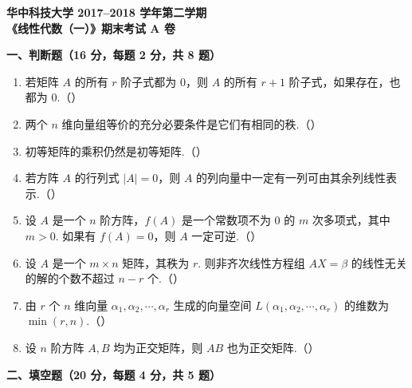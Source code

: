 \documentclass[a4paper,11pt]{ctexart}
\begin{document}
\begin{center}
  {\Large\bfseries 华中科技大学 2017--2018 学年第二学期}\\[0.4em]
  {\Large\bfseries 《线性代数（一）》期末考试 A 卷}
\end{center}

\vspace{0.8em}

\textbf{一、判断题（16 分，每题 2 分，共 8 题）}

\begin{enumerate}[label=\arabic*., leftmargin=2em, itemsep=0.55em, topsep=0.5em]
  \item 若矩阵 $A$ 的所有 $r$ 阶子式都为 $0$，则 $A$ 的所有 $r+1$ 阶子式，如果存在，也都为 $0$.（\quad）

  \item 两个 $n$ 维向量组等价的充分必要条件是它们有相同的秩.（\quad）

  \item 初等矩阵的乘积仍然是初等矩阵.（\quad）

  \item 若方阵 $A$ 的行列式 $|A| = 0$，则 $A$ 的列向量中一定有一列可由其余列线性表示.（\quad）

  \item 设 $A$ 是一个 $n$ 阶方阵，$f(A)$ 是一个常数项不为 $0$ 的 $m$ 次多项式，其中 $m > 0$. 如果有 $f(A) = 0$，则 $A$ 一定可逆.（\quad）

  \item 设 $A$ 是一个 $m \times n$ 矩阵，其秩为 $r$. 则非齐次线性方程组 $AX = \beta$ 的线性无关的解的个数不超过 $n - r$ 个.（\quad）

  \item 由 $r$ 个 $n$ 维向量 $\alpha_1, \alpha_2, \cdots, \alpha_r$ 生成的向量空间 $L(\alpha_1, \alpha_2, \cdots, \alpha_r)$ 的维数为 $\min(r, n)$.（\quad）

  \item 设 $n$ 阶方阵 $A, B$ 均为正交矩阵，则 $AB$ 也为正交矩阵.（\quad）
\end{enumerate}

\vspace{0.9em}

\textbf{二、填空题（20 分，每题 4 分，共 5 题）}
\end{document}
